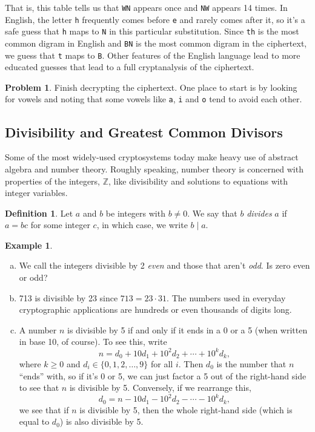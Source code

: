\documentclass[12pt]{article}
\theoremstyle{plain}
\theoremstyle{definition}
\newtheorem{definition}[theorem]{Definition}
\newtheorem{problem}[theorem]{Problem}
\newtheorem{example}[theorem]{Example}
\theoremstyle{remark}
\newcommand{\Z}{\mathbb{Z}}
\begin{document}
That is, this table tells us that \texttt{WN} appears once and \texttt{NW} appears 14 times.
In English, the letter \texttt{h} frequently comes before \texttt{e} and rarely comes after it, so it's a safe guess that \texttt{h} maps to \texttt{N} in this particular substitution.
Since \texttt{th} is the most common digram in English and \texttt{BN} is the most common digram in the ciphertext, we guess that \texttt{t} maps to \texttt{B}.
Other features of the English language lead to more educated guesses that lead to a full cryptanalysis of the ciphertext.

\begin{problem}
    Finish decrypting the ciphertext. One place to start is by looking for vowels and noting that some vowels like \texttt{a}, \texttt{i} and \texttt{o} tend to avoid each other.
\end{problem}



\subsection{Divisibility and Greatest Common Divisors}
Some of the most widely-used cryptosystems today make heavy use of abstract algebra and number theory.
Roughly speaking, number theory is concerned with properties of the integers, $\Z$, like divisibility and solutions to equations with integer variables.

\begin{definition}
    Let $a$ and $b$ be integers with $b\neq 0$. We say that $b$ \emph{divides} $a$ if $a=bc$ for some integer $c$, in which case, we write $b\mid a$.
\end{definition}

\begin{example}
    \begin{enumerate}[(a)]
        \item We call the integers divisible by 2 \emph{even} and those that aren't \emph{odd}. Is zero even or odd?

        \item 713 is divisible by 23 since $713 = 23\cdot 31$. The numbers used in everyday cryptographic applications are hundreds or even thousands of digits long.

        \item A number $n$ is divisible by 5 if and only if it ends in a 0 or a 5 (when written in base 10, of course). To see this, write
        \[
            n = d_0 + 10d_1 + 10^2d_2 + \cdots + 10^kd_k,
        \]
        where $k\geq 0$ and $d_i \in \{0, 1, 2, \ldots, 9\}$ for all $i$.
        Then $d_0$ is the number that $n$ ``ends'' with, so if it's 0 or 5, we can just factor a 5 out of the right-hand side to see that $n$ is divisible by 5.
        Conversely, if we rearrange this,
        \[
            d_0 = n - 10d_1 - 10^2d_2 - \cdots - 10^kd_k,
        \]
        we see that if $n$ is divisible by 5, then the whole right-hand side (which is equal to $d_0$) is also divisible by 5.
    \end{enumerate}
\end{example}
\end{document}
